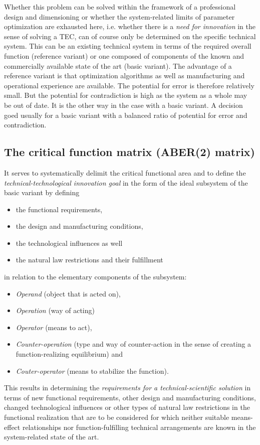\documentclass[11pt,a4paper]{article}
\begin{document}
Whether this problem can be solved within the framework of a professional
design and dimensioning or whether the system-related limits of parameter
optimization are exhausted here, i.e.  whether there is a \emph{need for
  innovation} in the sense of solving a TEC, can of course only be determined
on the specific technical system.  This can be an existing technical system in
terms of the required overall function (reference variant) or one composed of
components of the known and commercially available state of the art (basic
variant). The advantage of a reference variant is that optimization algorithms
as well as manufacturing and operational experience are available. The
potential for error is therefore relatively small. But the potential for
contradiction is high as the system as a whole may be out of date. It is the
other way in the case with a basic variant. A decision goed usually for a
basic variant with a balanced ratio of potential for error and contradiction.

\subsection{The critical function matrix (ABER(2) matrix)}

It serves to systematically delimit the critical functional area and to define
the \emph{technical-technological innovation goal} in the form of the ideal
subsystem of the basic variant by defining
\begin{itemize}
\item the functional requirements,
\item the design and manufacturing conditions,
\item the technological influences as well
\item the natural law restrictions and their fulfillment
\end{itemize}
in relation to the elementary components of the subsystem:
\begin{itemize}
\item \emph{Operand} (object that is acted on),
\item \emph{Operation} (way of acting)
\item \emph{Operator} (means to act),
\item \emph{Counter-operation} (type and way of counter-action in the sense of
  creating a function-realizing equilibrium) and
\item \emph{Couter-operator} (means to stabilize the function).
\end{itemize}
This results in determining the \emph{requirements for a technical-scientific
  solution} in terms of new functional requirements, other design and
manufacturing conditions, changed technological influences or other types of
natural law restrictions in the functional realization that are to be
considered for which neither suitable means-effect relationships nor
function-fulfilling technical arrangements are known in the system-related
state of the art.
\end{document}
